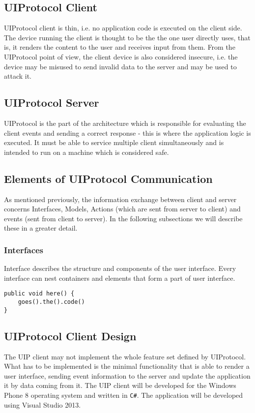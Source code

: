 \subsection{UIProtocol Client}
UIProtocol client is thin, i.e. no application code is executed on the client side. The device running the client is thought to be the the one user directly uses, that is, it renders the content to the user and receives input from them. From the UIProtocol point of view, the client device is also considered insecure, i.e. the device may be misused to send invalid data to the server and may be used to attack it.

\subsection{UIProtocol Server}
UIProtocol is the part of the architecture which is responsible for evaluating the client events and sending a correct response - this is where the application logic is executed. It must be able to service multiple client simultaneously and is intended to run on a machine which is considered safe.


\subsection{Elements of UIProtocol Communication}
As mentioned previously, the information exchange between client and server concerns Interfaces, Models, Actions (which are sent from server to client) and events (sent from client to server). In the following subsections we will describe these in a greater detail.

\subsubsection{Interfaces}
Interface describes the structure and components of the user interface. Every interface can nest containers and elements that form a part of user interface.\\

\begin{lstlisting}[label=some-code,caption=Some Code]
public void here() {
	goes().the().code()
}
\end{lstlisting}

\newpage
\subsection{UIProtocol Client Design}
The UIP client may not implement the whole feature set defined by UIProtocol. What has to be implemented is the minimal functionality that is able to render a user interface, sending event information to the server and update the application it by data coming from it.
The UIP client will be developed for the Windows Phone 8 operating system and written in \texttt{C\#}. The application will be developed using Visual Studio 2013. 
\endinput